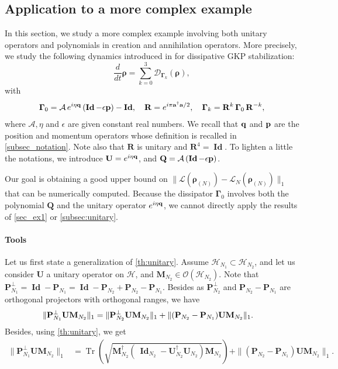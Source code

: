 \documentclass[a4paper,onecolumn,amsmath,amssymb,amsfonts,accepted=2026-03-06]{quantumarticle}
\newcommand{\xL}{\mathcal{L}}
\newcommand{\Id}{\operatorname{\mathbf{Id}}}
\newcommand{\xH}{\mathcal{H}}
\newcommand{\xP}{\mathbf{Q}}
\newcommand{\xtr}[1]{\operatorname{Tr}\left(#1 \right)}
\newcommand{\cD}{\mathcal D}
\newcommand{\LL}{{\mathbf{\Gamma}}}
\newcommand{\Proj}[1]{\mathbf{P}_{#1}}
\newcommand{\cA}{\mathcal A}
\newcommand{\qop}{{\bf q}}
\newcommand{\Pop}{{\bf p}}
\newcommand{\destroy}{{\bf a}}
\newcommand{\create}{{\bf a^\dag}}
\newcommand{\rN}{{\boldsymbol{\rho}_{(N)}}}
\newcommand{\Uop}{\mathbf{U}}
\begin{document}
\subsection{Application to a more complex example}
\label{subsec:GKP}
In this section, we study a more complex example involving both unitary operators and polynomials in creation and annihilation operators. More precisely, we study the following dynamics introduced in \cite{PhysRevX.15.011011} for dissipative GKP stabilization:
\begin{equation}
	\label{eq:lindblad-GKP}
	\frac{d}{dt} \boldsymbol{\rho} = \sum_{k=0}^{3} \cD_{\LL_k} (\boldsymbol{\rho}),
\end{equation}
with
\begin{align}
    \LL_0 = \cA \, e^{i\eta\qop} \left(  \Id-\epsilon\Pop\right) -  \Id,\quad
	\mathbf{R}= e^{i\pi {\create \destroy}/2}, \quad
	\LL_k = \mathbf{R}^k \, \LL_0 \, \mathbf{R}^{-k},
    \label{eq:def-LGKP}
\end{align}
where $\mathcal{A},\eta$ and $\epsilon$ are given constant real numbers. We recall that $\qop$ and $\Pop$ are the position and momentum operators whose definition is recalled in \cref{subsec_notation}. Note also that $\mathbf{R}$ is unitary and $\mathbf{R}^4=\Id$. To lighten a little the notations, we introduce $\Uop=e^{i\eta \qop}$, and $\xP=\cA \left(  \Id-\epsilon\Pop\right)$.

Our goal is obtaining a good upper bound on $\|\xL(\rN)-\xL_N(\rN)\|_1$ that can be numerically computed. Because the dissipator $\LL_0$ involves both the polynomial $\xP$ and the unitary operator $e^{i\eta\qop}$, we cannot directly apply the results of \cref{sec_ex1} or \cref{subsec:unitary}.

\paragraph{Tools}
Let us first state a generalization of \cref{th:unitary}. Assume $\xH_{N_1}\subset \xH_{N_2}$, and let us consider $\Uop$ a unitary operator on $\xH$, and $\mathbf{M}_{N_2}\in \mathcal{O}(\xH_{N_2})$.  Note that $\Proj{N_1}^\perp = \Id-\Proj{N_1}=\Id-\Proj{N_2}+\Proj{N_2}-\Proj{N_1}$. Besides as $\Proj{N_2}^\perp$ and $\Proj{N_2}-\Proj{N_1}$ are orthogonal projectors with orthogonal ranges, we have
\begin{align}
	\notag\|\Proj{N_1}^\perp \Uop \mathbf{M}_{N_2}\|_1 &=  \|\Proj{N_2}^\perp \Uop \mathbf{M}_{N_2}\|_1 + \|(\Proj{N_2} - \Proj{N_1}) \Uop \mathbf{M}_{N_2}\|_1.
\end{align}
Besides, using \cref{th:unitary}, we get 
\begin{align}
	\label{th:unitary_mod}
	\|\Proj{N_1}^\perp \Uop \mathbf{M}_{N_2}\|_1&=  \xtr{\sqrt{\mathbf{M}_{N_2}^\dagger(\ \Id_{N_2} - \Uop_{N_2}^\dagger \Uop_{N_2})\mathbf{M}_{N_2}}} + \|(\Proj{N_2} - \Proj{N_1}) \Uop \mathbf{M}_{N_2}\|_1.
\end{align}
\end{document}
